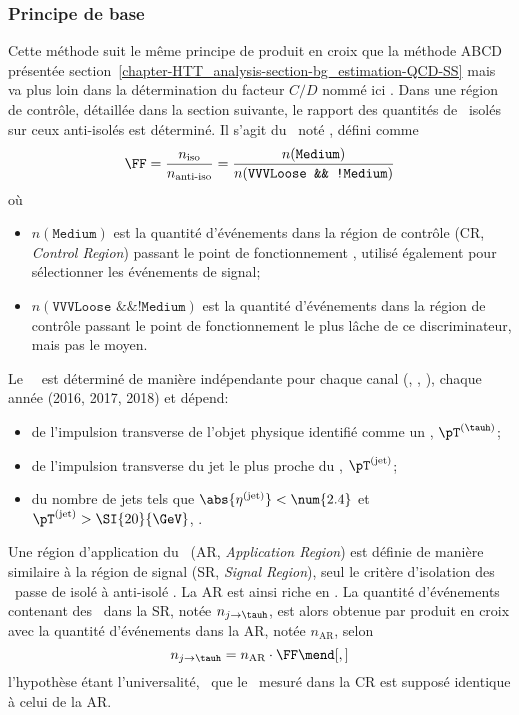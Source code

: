 \subsubsection{Principe de base}
Cette méthode suit le même principe de produit en croix que la méthode \og ABCD \fg{} présentée section~\ref{chapter-HTT_analysis-section-bg_estimation-QCD-SS} mais va plus loin dans la détermination du facteur $C/D$ nommé ici \fakefactor.
Dans une région de contrôle, détaillée dans la section suivante, le rapport des quantités de \tauh\ isolés sur ceux anti-isolés est déterminé.
Il s'agit du \fakefactor\, noté \FF, défini comme
\begin{equation}
\FF = \frac{n_\text{iso}}{n_\text{anti-iso}} = \frac{n(\texttt{Medium})}{n(\texttt{VVVLoose \&\& !Medium})}
\label{eq-chapter-HTT_analysis-section-bg_estimation-FF_method-FF_def_global}
\end{equation}
où
\begin{itemize}
\item $n(\texttt{Medium})$ est la quantité d'événements dans la région de contrôle (CR, \emph{Control Region}) passant le point de fonctionnement , utilisé également pour sélectionner les événements de signal;
\item $n(\texttt{VVVLoose \&\& !Medium})$ est la quantité d'événements dans la région de contrôle passant le point de fonctionnement le plus lâche de ce discriminateur, mais pas le moyen.
\end{itemize}
Le \fakefactor\ \FF\ est déterminé de manière indépendante pour chaque canal (\tauh\tauh, \mu\tauh, \ele\tauh), chaque année (2016, 2017, 2018) et dépend:
\begin{itemize}
\item de l'impulsion transverse de l'objet physique identifié comme un \tauh, $\pT^{(\tauh)}$;
\item de l'impulsion transverse du jet le plus proche du \tauh, $\pT^{(\text{jet})}$;
\item du nombre de jets tels que $\abs{\eta^{(\text{jet})}}<\num{2.4}$ et $\pT^{(\text{jet})}>\SI{20}{\GeV}$, \Nprebjets.
\end{itemize}
\par
Une région d'application du \fakefactor\ (AR, \emph{Application Region}) est définie de manière similaire à la région de signal (SR, \emph{Signal Region}), seul le critère d'isolation des \tauh\ passe de \og isolé \fg{}  à \og anti-isolé \fg.
La AR est ainsi riche en \ftauhs.
La quantité d'événements contenant des \ftauhs\ dans la SR, notée $n_{j\to\tauh}$, est alors obtenue par produit en croix avec la quantité d'événements dans la AR, notée $n_\text{AR}$,  selon
\begin{equation}
n_{j\to\tauh} = n_\text{AR} \cdot \FF
\mend[,]
\end{equation}
l'hypothèse étant l'universalité, \ie\ que le \fakefactor\ mesuré dans la CR est supposé identique à celui de la AR.
